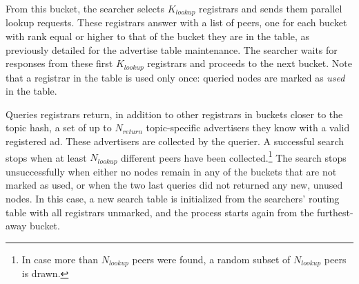From this bucket, the searcher selects $K_\textit{lookup}$ registrars and sends them parallel lookup requests.
These registrars answer with a list of peers, one for each bucket with rank equal or higher to that of the bucket they are in the table, as previously detailed for the advertise table maintenance. 
The searcher waits for responses from these first $K_\textit{lookup}$ registrars and proceeds to the next bucket. 
Note that a registrar in the table is used only once: queried nodes are marked as \emph{used} in the table.

Queries registrars return, in addition to other registrars in buckets closer to the topic hash, a set of up to $N_\textit{return}$ topic-specific advertisers they know with a valid registered ad.
These advertisers are collected by the querier.
A successful search stops when at least $N_\textit{lookup}$ different peers have been collected.\footnote{In case more than $N_\textit{lookup}$ peers were found, a random subset of $N_\textit{lookup}$ peers is drawn.}
The search stops unsuccessfully when either no nodes remain in any of the buckets that are not marked as used, or when the two last queries did not returned any new, unused nodes. 
In this case, a new search table is initialized from the searchers' routing table with all registrars unmarked, and the process starts again from the furthest-away bucket.


